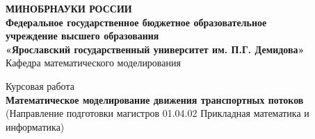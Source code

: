 \documentclass[12pt, a4paper]{extarticle}
\numberwithin{equation}{section}
\begin{document}
\thispagestyle{empty} 
\medskip 

\begin{center} 
	\textbf{МИНОБРНАУКИ РОССИИ\\ 
		\vspace{0.5cm} 
		Федеральное государственное бюджетное образовательное\\ 
		учреждение высшего образования\\ 
		«Ярославский государственный университет им. П.Г. Демидова»}\\ 
	\vspace{0.5cm} 
	{Кафедра математического моделирования}\\ 
	\vspace{1.5cm} 
	
\end{center}
\vspace{5cm} 
\begin{center} 
	Курсовая работа\\ 
	\vspace{0.5cm} 
	\textbf{Математическое моделирование движения транспортных потоков}\\ 
	\small{(Направление подготовки магистров 01.04.02 Прикладная математика и информатика)}
	\vspace{3cm} 
\end{center} 
\end{document}

